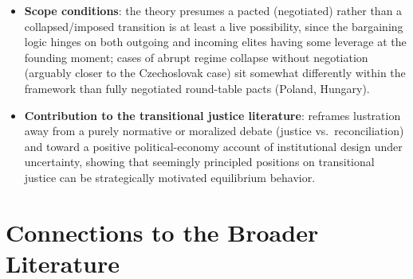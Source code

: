 \documentclass[12pt]{article}
\begin{document}
\begin{itemize}[leftmargin=*, itemsep=4pt]
    \item \textbf{Scope conditions}: the theory presumes a pacted (negotiated) rather than a collapsed/imposed transition is at least a live possibility, since the bargaining logic hinges on both outgoing and incoming elites having some leverage at the founding moment; cases of abrupt regime collapse without negotiation (arguably closer to the Czechoslovak case) sit somewhat differently within the framework than fully negotiated round-table pacts (Poland, Hungary).
    \item \textbf{Contribution to the transitional justice literature}: reframes lustration away from a purely normative or moralized debate (justice vs.\ reconciliation) and toward a positive political-economy account of institutional design under uncertainty, showing that seemingly principled positions on transitional justice can be strategically motivated equilibrium behavior.
\end{itemize}

\section{Connections to the Broader Literature}
\end{document}
